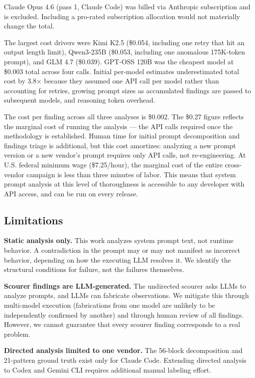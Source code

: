 Claude Opus 4.6 (pass 1, Claude Code) was billed via Anthropic
subscription and is excluded. Including a pro-rated subscription
allocation would not materially change the total.

The largest cost drivers were Kimi K2.5 (\$0.054, including one retry
that hit an output length limit), Qwen3-235B (\$0.053, including one
anomalous 175K-token prompt), and GLM 4.7 (\$0.039). GPT-OSS 120B was
the cheapest model at \$0.003 total across four calls. Initial per-model
estimates underestimated total cost by 3.8× because they assumed one API
call per model rather than accounting for retries, growing prompt sizes
as accumulated findings are passed to subsequent models, and reasoning
token overhead.

The cost per finding across all three analyses is \$0.002. The \$0.27
figure reflects the marginal cost of running the analysis --- the API
calls required once the methodology is established. Human time for
initial prompt decomposition and findings triage is additional, but this
cost amortizes: analyzing a new prompt version or a new vendor's prompt
requires only API calls, not re-engineering. At U.S. federal minimum
wage (\$7.25/hour), the marginal cost of the entire cross-vendor
campaign is less than three minutes of labor. This means that system
prompt analysis at this level of thoroughness is accessible to any
developer with API access, and can be run on every release.

\subsection{Limitations}

\textbf{Static analysis only.} This work analyzes system prompt text,
not runtime behavior. A contradiction in the prompt may or may not
manifest as incorrect behavior, depending on how the executing LLM
resolves it. We identify the structural conditions for failure, not the
failures themselves.

\textbf{Scourer findings are LLM-generated.} The undirected scourer asks
LLMs to analyze prompts, and LLMs can fabricate observations. We
mitigate this through multi-model execution (fabrications from one model
are unlikely to be independently confirmed by another) and through human
review of all findings. However, we cannot guarantee that every scourer
finding corresponds to a real problem.

\textbf{Directed analysis limited to one vendor.} The 56-block
decomposition and 21-pattern ground truth exist only for Claude Code.
Extending directed analysis to Codex and Gemini CLI requires additional
manual labeling effort.

